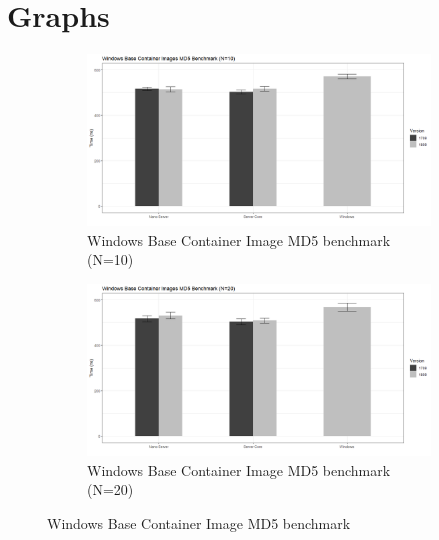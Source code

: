 \section{Graphs}
\begin{figure}[h]
	\begin{subfigure}{\textwidth}
	\captionsetup{width=0.8\linewidth}
	\includegraphics[width=0.9\linewidth]{img/Methodologie/Containers3.png}
	\centering
	\caption{Windows Base Container Image MD5 benchmark (N=10)}
	\end{subfigure}
	\begin{subfigure}{\textwidth}
	\captionsetup{width=0.8\linewidth}
	\includegraphics[width=0.9\linewidth]{img/Methodologie/Containers1.png}
	\centering
	\caption{Windows Base Container Image MD5 benchmark (N=20)}
	\end{subfigure}
	\label{fig:MD5Benchmark}
	\caption[MD5 benchmark]{Windows Base Container Image MD5 benchmark}
\end{figure}
